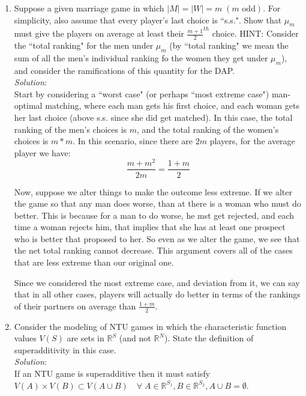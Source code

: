 \documentclass{article}
\begin{document}
\begin{enumerate}
%
\item Suppose a given marriage game in which $|M| = |W| = m \;(m \text{ odd})$. For simplicity, also assume that every player's last choice is ``s.s.". Show that $\mu_{m}$ must give the players on average at least their $\frac{m + 1}{2}^{th}$ choice. HINT: Consider the ``total ranking" for the men under $\mu_{m}$ (by ``total ranking" we mean the sum of all the men's individual ranking fo the women they get under $\mu_{m}$), and consider the ramifications of this quantity for the DAP. \\

\textit{Solution}: \\

Start by considering a ``worst case" (or perhaps ``most extreme case") man-optimal matching, where each man gets his first choice, and each woman gets her last choice (above s.s. since she did get matched). In this case, the total ranking of the men's choices is $m$, and the total ranking of the women's choices is $m * m$. In this scenario, since there are $2m$ players, for the average player we have:
\[ \frac{m + m^{2}}{2m} = \frac{1 + m}{2} \]

Now, suppose we alter things to make the outcome less extreme. If we alter the game so that any man does worse, than at there is a woman who must do better. This is because for a man to do worse, he mst get rejected, and each time a woman rejects him, that implies that she has at least one prospect who is better that proposed to her. So even as we alter the game, we see that the net total ranking cannot decrease. This argument covers all of the cases that are less extreme than our original one.

Since we considered the most extreme case, and deviation from it, we can say that in all other cases, players will actually do better in terms of the rankings of their partners on average than $\frac{1 + m}{2}$.

%
\item Consider the modeling of NTU games in which the characteristic function values $V(S)$ are sets in $\mathbb{R}^{S}$ (and not $\mathbb{R}^{N}$). State the definition of superadditivity in this case. \\

\textit{Solution}: \\

If an NTU game is superadditive then it must satisfy $V(A) \times V(B) \subset V(A \cup B) \quad \forall \; A \in \mathbb{R}^{S_{1}}, B \in \mathbb{R}^{S_{2}}, A \cup B = \emptyset$.


\end{enumerate}
\end{document}
